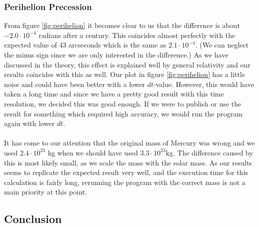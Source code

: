 \documentclass{article}
\newcommand{\E}[1]{\cdot 10^{#1}}
\begin{document}
\subsubsection{Perihelion Precession}
From figure \ref{fig:perihelion} it becomes clear to us that the difference is about $-2.0\E{-4}$ radians after a century. This coincides almost perfectly with the expected value of 43 arcseconds which is the same as $2.1\E{-4}$. (We can neglect the minus sign since we are only interested in the difference.) As we have discussed in the theory, this effect is explained well by general relativity and our results coincides with this as well. Our plot in figure \ref{fig:perihelion} has a little noise and could have been better with a lower $dt$-value. However, this would have taken a long time and since we have a pretty good result with this time resolution, we decided this was good enough. If we were to publish or use the result for something which required high accuracy, we would run the program again with lower $dt$. \\ \\
It has come to our attention that the original mass of Mercury was wrong and we used $2.4\E{23}$ kg when we should have used $3.3 \E{23}$kg. The difference caused by this is most likely small, as we scale the mass with the solar mass. As our results seems to replicate the expected result very well, and the execution time for this calculation is fairly long, rerunning the program with the correct mass is not a main priority at this point. %
\subsection{Conclusion}

\end{document}
